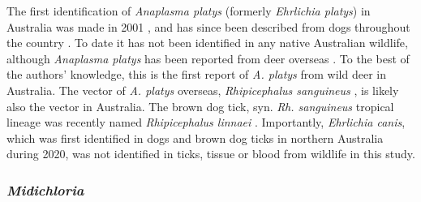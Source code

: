 \documentclass[a4paper, nobind]{templates/ociamthesis}
\begin{document}
The first identification of \emph{Anaplasma platys} (formerly \emph{Ehrlichia platys}) in Australia was made in 2001 \autocite{brownDetectionEhrlichiaPlatys2001}, and has since been described from dogs throughout the country \autocite{brownDetectionAnaplasmaPlatys2006,hiiCanineVectorborneDisease2012}.
To date it has not been identified in any native Australian wildlife, although \emph{Anaplasma platys} has been reported from deer overseas \autocite{yuPrevalenceCommonTickborne2020}.
To the best of the authors' knowledge, this is the first report of \emph{A. platys} from wild deer in Australia. The vector of \emph{A. platys} overseas, \emph{Rhipicephalus sanguineus} \autocite{snellgroveVectorCompetenceRhipicephalus2020}, is likely also the vector in Australia.
The brown dog tick, syn. \emph{Rh. sanguineus} tropical lineage was recently named \emph{Rhipicephalus linnaei} \autocite{slapetaTropicalLineageBrown2021}. Importantly, \emph{Ehrlichia canis}, which was first identified in dogs and brown dog ticks in northern Australia during 2020, was not identified in ticks, tissue or blood from wildlife in this study.

\hypertarget{midichloria-1}{%
\subsubsection{\texorpdfstring{\emph{Midichloria}}{Midichloria}}\label{midichloria-1}}
\end{document}
